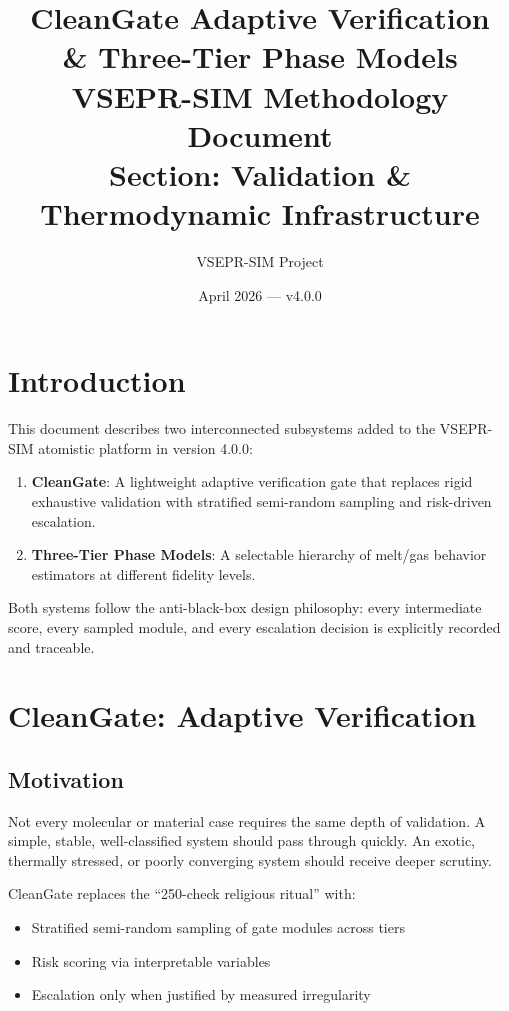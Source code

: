 \documentclass[11pt,a4paper]{article}
\title{%
  \textbf{CleanGate Adaptive Verification} \\[0.3em]
  \textbf{\& Three-Tier Phase Models} \\[0.5em]
  \large VSEPR-SIM Methodology Document \\
  \large Section: Validation \& Thermodynamic Infrastructure
}
\author{VSEPR-SIM Project}
\date{April 2026 --- v4.0.0}
\begin{document}
\maketitle
\tableofcontents
\newpage

\section{Introduction}

This document describes two interconnected subsystems added to the VSEPR-SIM
atomistic platform in version 4.0.0:

\begin{enumerate}
  \item \textbf{CleanGate}: A lightweight adaptive verification gate that
        replaces rigid exhaustive validation with stratified semi-random
        sampling and risk-driven escalation.
  \item \textbf{Three-Tier Phase Models}: A selectable hierarchy of
        melt/gas behavior estimators at different fidelity levels.
\end{enumerate}

Both systems follow the anti-black-box design philosophy: every intermediate
score, every sampled module, and every escalation decision is explicitly
recorded and traceable.

\section{CleanGate: Adaptive Verification}

\subsection{Motivation}

Not every molecular or material case requires the same depth of validation.
A simple, stable, well-classified system should pass through quickly.
An exotic, thermally stressed, or poorly converging system should receive
deeper scrutiny.

CleanGate replaces the ``250-check religious ritual'' with:
\begin{itemize}
  \item Stratified semi-random sampling of gate modules across tiers
  \item Risk scoring via interpretable variables
  \item Escalation only when justified by measured irregularity
\end{itemize}
\end{document}
